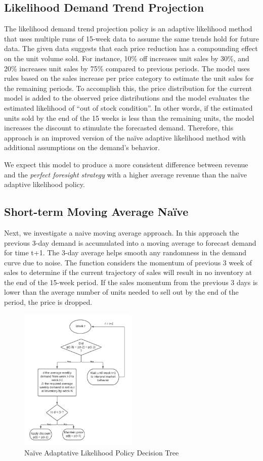 \documentclass[11pt,a4paper]{article}
\begin{document}
\subsection{Likelihood Demand Trend Projection}
The likelihood demand trend projection policy is an adaptive likelihood method that uses multiple runs of 15-week data to assume the same trends hold for future data. 
The given data suggests that each price reduction has a compounding effect on the unit volume sold. 
For instance, 10\% off increases unit sales by 30\%, and 20\% increases unit sales by 75\% compared to previous periods. 
The model uses rules based on the sales increase per price category to estimate the unit sales for the remaining periods. 
To accomplish this, the price distribution for the current model is added to the observed price distributions and the model evaluates the estimated likelihood of “out of stock condition”. 
In other words, if the estimated units sold by the end of the 15 weeks is less than the remaining units, the model increases the discount to stimulate the forecasted demand. 
Therefore, this approach is an improved version of the naïve adaptive likelihood method with additional assumptions on the demand’s behavior.

We expect this model to produce a more consistent difference between revenue and the \emph{perfect foresight strategy} with a higher average revenue than the naïve adaptive likelihood policy.

\subsection{Short-term Moving Average Naïve}
Next, we investigate a naive moving average approach. 
In this approach the previous 3-day demand is accumulated into a moving average to forecast demand for time t+1. 
The 3-day average helps smooth any randomness in the demand curve due to noise. 
The function considers the momentum of previous 3 week of sales to determine if the current trajectory of sales will result in no inventory at the end of the 15-week period. 
If the sales momentum from the previous 3 days is lower than the average number of units needed to sell out by the end of the period, the price is dropped. 

\begin{figure}[h]
    \centering
    \includegraphics[width=0.5\textwidth]{pic/f4.png}
    \caption{Naïve Adaptative Likelihood Policy Decision Tree}
\end{figure}
\end{document}
